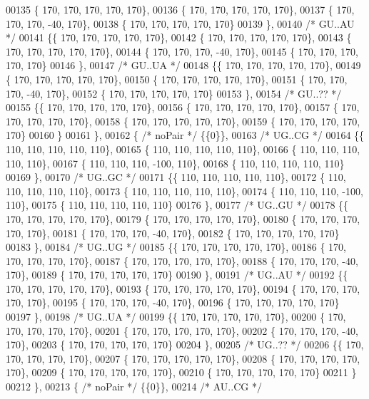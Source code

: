 \begin{DoxyCode}
00135 \{ 170, 170, 170, 170, 170\},
00136 \{ 170, 170, 170, 170, 170\},
00137 \{ 170, 170, 170, -40, 170\},
00138 \{ 170, 170, 170, 170, 170\}
00139 \},
00140 \textcolor{comment}{/* GU..AU */}
00141 \{\{ 170, 170, 170, 170, 170\},
00142 \{ 170, 170, 170, 170, 170\},
00143 \{ 170, 170, 170, 170, 170\},
00144 \{ 170, 170, 170, -40, 170\},
00145 \{ 170, 170, 170, 170, 170\}
00146 \},
00147 \textcolor{comment}{/* GU..UA */}
00148 \{\{ 170, 170, 170, 170, 170\},
00149 \{ 170, 170, 170, 170, 170\},
00150 \{ 170, 170, 170, 170, 170\},
00151 \{ 170, 170, 170, -40, 170\},
00152 \{ 170, 170, 170, 170, 170\}
00153 \},
00154 \textcolor{comment}{/* GU..?? */}
00155 \{\{ 170, 170, 170, 170, 170\},
00156 \{ 170, 170, 170, 170, 170\},
00157 \{ 170, 170, 170, 170, 170\},
00158 \{ 170, 170, 170, 170, 170\},
00159 \{ 170, 170, 170, 170, 170\}
00160 \}
00161 \},
00162 \{ \textcolor{comment}{/* noPair */} \{\{0\}\},
00163 \textcolor{comment}{/* UG..CG */}
00164 \{\{ 110, 110, 110, 110, 110\},
00165 \{ 110, 110, 110, 110, 110\},
00166 \{ 110, 110, 110, 110, 110\},
00167 \{ 110, 110, 110, -100, 110\},
00168 \{ 110, 110, 110, 110, 110\}
00169 \},
00170 \textcolor{comment}{/* UG..GC */}
00171 \{\{ 110, 110, 110, 110, 110\},
00172 \{ 110, 110, 110, 110, 110\},
00173 \{ 110, 110, 110, 110, 110\},
00174 \{ 110, 110, 110, -100, 110\},
00175 \{ 110, 110, 110, 110, 110\}
00176 \},
00177 \textcolor{comment}{/* UG..GU */}
00178 \{\{ 170, 170, 170, 170, 170\},
00179 \{ 170, 170, 170, 170, 170\},
00180 \{ 170, 170, 170, 170, 170\},
00181 \{ 170, 170, 170, -40, 170\},
00182 \{ 170, 170, 170, 170, 170\}
00183 \},
00184 \textcolor{comment}{/* UG..UG */}
00185 \{\{ 170, 170, 170, 170, 170\},
00186 \{ 170, 170, 170, 170, 170\},
00187 \{ 170, 170, 170, 170, 170\},
00188 \{ 170, 170, 170, -40, 170\},
00189 \{ 170, 170, 170, 170, 170\}
00190 \},
00191 \textcolor{comment}{/* UG..AU */}
00192 \{\{ 170, 170, 170, 170, 170\},
00193 \{ 170, 170, 170, 170, 170\},
00194 \{ 170, 170, 170, 170, 170\},
00195 \{ 170, 170, 170, -40, 170\},
00196 \{ 170, 170, 170, 170, 170\}
00197 \},
00198 \textcolor{comment}{/* UG..UA */}
00199 \{\{ 170, 170, 170, 170, 170\},
00200 \{ 170, 170, 170, 170, 170\},
00201 \{ 170, 170, 170, 170, 170\},
00202 \{ 170, 170, 170, -40, 170\},
00203 \{ 170, 170, 170, 170, 170\}
00204 \},
00205 \textcolor{comment}{/* UG..?? */}
00206 \{\{ 170, 170, 170, 170, 170\},
00207 \{ 170, 170, 170, 170, 170\},
00208 \{ 170, 170, 170, 170, 170\},
00209 \{ 170, 170, 170, 170, 170\},
00210 \{ 170, 170, 170, 170, 170\}
00211 \}
00212 \},
00213 \{ \textcolor{comment}{/* noPair */} \{\{0\}\},
00214 \textcolor{comment}{/* AU..CG */}

\end{DoxyCode}
